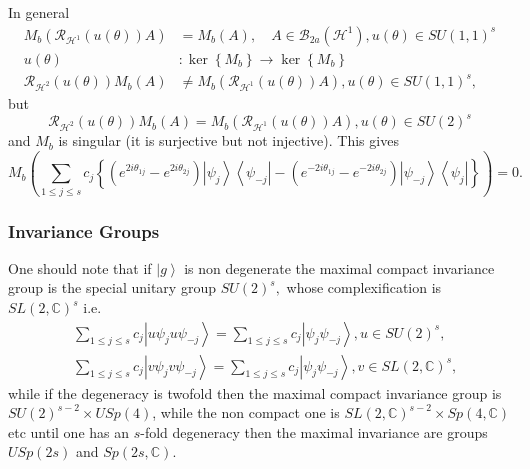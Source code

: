 \documentclass[aps,preprint]{revtex4}%
\begin{document}
In general
\begin{align}
M_{b}\left(  \mathcal{R}_{\mathcal{H}^{1}}\left(  u\left(  \theta\right)
\right)  A\right)   &  =M_{b}\left(  A\right)  ,\quad A\in\mathcal{B}%
_{2a}\left(  \mathcal{H}^{1}\right)  ,u\left(  \theta\right)  \in SU\left(
1,1\right)  ^{s}\nonumber\\
u\left(  \theta\right)   &  :\ker\left\{  M_{b}\right\}  \rightarrow
\ker\left\{  M_{b}\right\} \nonumber\\
\mathcal{R}_{\mathcal{H}^{2}}\left(  u\left(  \theta\right)  \right)
M_{b}\left(  A\right)   &  \neq M_{b}\left(  \mathcal{R}_{\mathcal{H}^{1}%
}\left(  u\left(  \theta\right)  \right)  A\right)  ,u\left(  \theta\right)
\in SU\left(  1,1\right)  ^{s},
\end{align}
but
\begin{equation}
\mathcal{R}_{\mathcal{H}^{2}}\left(  u\left(  \theta\right)  \right)
M_{b}\left(  A\right)  =M_{b}\left(  \mathcal{R}_{\mathcal{H}^{1}}\left(
u\left(  \theta\right)  \right)  A\right)  ,u\left(  \theta\right)  \in
SU\left(  2\right)  ^{s}%
\end{equation}
and $M_{b}$ is singular (it is surjective but not injective). This gives
\begin{equation}
M_{b}\left(  \sum_{1\leq j\leq s}c_{j}\left\{  \left(  e^{2i\theta_{1j}%
}-e^{2i\theta_{2j}}\right)  \left\vert \psi_{j}\right\rangle \left\langle
\psi_{-j}\right\vert -\left(  e^{-2i\theta_{1j}}-e^{-2i\theta_{2j}}\right)
\left\vert \psi_{-j}\right\rangle \left\langle \psi_{j}\right\vert \right\}
\right)  =0.
\end{equation}


\subsubsection{Invariance Groups}

One should note that if $\left\vert g\right\rangle $ is non degenerate the
maximal compact invariance group is the special unitary group $SU\left(
2\right)  ^{s},$ whose complexification is $SL\left(  2,\mathbb{C}\right)
^{s}$ i.e.
\begin{align}
&  \sum_{1\leq j\leq s}c_{j}\left\vert u\psi_{j}u\psi_{-j}\right\rangle
=\sum_{1\leq j\leq s}c_{j}\left\vert \psi_{j}\psi_{-j}\right\rangle ,u\in
SU\left(  2\right)  ^{s},\nonumber\\
&  \sum_{1\leq j\leq s}c_{j}\left\vert v\psi_{j}v\psi_{-j}\right\rangle
=\sum_{1\leq j\leq s}c_{j}\left\vert \psi_{j}\psi_{-j}\right\rangle ,v\in
SL\left(  2,\mathbb{C}\right)  ^{s},
\end{align}
while if the degeneracy is twofold then the maximal compact invariance group
is $SU\left(  2\right)  ^{s-2}\times USp\left(  4\right)  $, while the non
compact one is $SL\left(  2,\mathbb{C}\right)  ^{s-2}\times Sp\left(
4,\mathbb{C}\right)  $ etc until one has an $s$-fold degeneracy then the
maximal invariance are groups $USp\left(  2s\right)  $ and $Sp\left(
2s,\mathbb{C}\right)  .$
\end{document}

